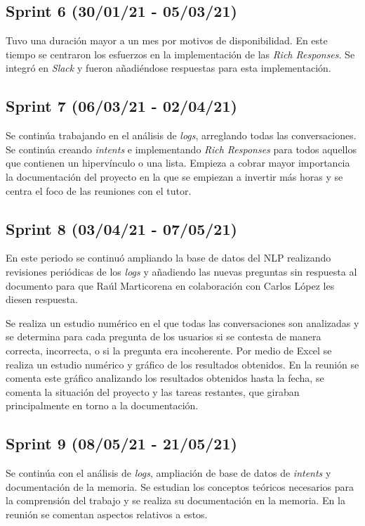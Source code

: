 \subsection{Sprint 6 (30/01/21 - 05/03/21)}

Tuvo una duración mayor a un mes por motivos de disponibilidad. En este tiempo se centraron los esfuerzos en la implementación de las \textit{Rich Responses}. Se integró en \textit{Slack} y fueron añadiéndose respuestas para esta implementación.


\subsection{Sprint 7 (06/03/21 - 02/04/21)}

Se continúa trabajando en el análisis de \textit{logs}, arreglando todas las conversaciones. Se continúa creando \textit{intents} e implementando \textit{Rich Responses} para todos aquellos que contienen un hipervínculo o una lista.
Empieza a cobrar mayor importancia la documentación del proyecto en la que se empiezan a invertir más horas y se centra el foco de las reuniones con el tutor.

\subsection{Sprint 8 (03/04/21 - 07/05/21)}

En este periodo se continuó ampliando la base de datos del NLP realizando revisiones periódicas de los \textit{logs} y añadiendo las nuevas preguntas sin respuesta al documento para que Raúl Marticorena en colaboración con Carlos López les diesen respuesta.

Se realiza un estudio numérico en el que todas las conversaciones son analizadas y se determina para cada pregunta de los usuarios si se contesta de manera correcta, incorrecta, o si la pregunta era incoherente. Por medio de Excel se realiza un estudio numérico y gráfico de los resultados obtenidos.
En la reunión se comenta este gráfico analizando los resultados obtenidos hasta la fecha, se comenta la situación del proyecto y las tareas restantes, que giraban principalmente en torno a la documentación.

\subsection{Sprint 9 (08/05/21 - 21/05/21)}

Se continúa con el análisis de \textit{logs}, ampliación de base de datos de \textit{intents} y documentación de la memoria. Se estudian los conceptos teóricos necesarios para la comprensión del trabajo y se realiza su documentación en la memoria. En la reunión se comentan aspectos relativos a estos.

